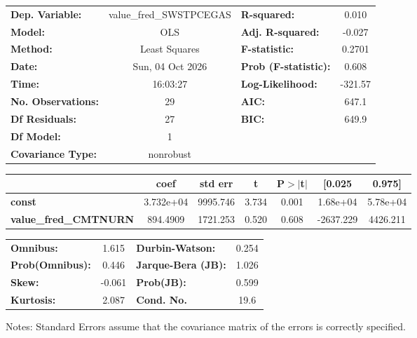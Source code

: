 \begin{center}
\begin{tabular}{lclc}
\toprule
\textbf{Dep. Variable:}       & value\_fred\_SWSTPCEGAS & \textbf{  R-squared:         } &     0.010   \\
\textbf{Model:}               &           OLS           & \textbf{  Adj. R-squared:    } &    -0.027   \\
\textbf{Method:}              &      Least Squares      & \textbf{  F-statistic:       } &    0.2701   \\
\textbf{Date:}                &     Sun, 04 Oct 2026    & \textbf{  Prob (F-statistic):} &    0.608    \\
\textbf{Time:}                &         16:03:27        & \textbf{  Log-Likelihood:    } &   -321.57   \\
\textbf{No. Observations:}    &              29         & \textbf{  AIC:               } &     647.1   \\
\textbf{Df Residuals:}        &              27         & \textbf{  BIC:               } &     649.9   \\
\textbf{Df Model:}            &               1         & \textbf{                     } &             \\
\textbf{Covariance Type:}     &        nonrobust        & \textbf{                     } &             \\
\bottomrule
\end{tabular}
\begin{tabular}{lcccccc}
                              & \textbf{coef} & \textbf{std err} & \textbf{t} & \textbf{P$> |$t$|$} & \textbf{[0.025} & \textbf{0.975]}  \\
\midrule
\textbf{const}                &    3.732e+04  &     9995.746     &     3.734  &         0.001        &     1.68e+04    &     5.78e+04     \\
\textbf{value\_fred\_CMTNURN} &     894.4909  &     1721.253     &     0.520  &         0.608        &    -2637.229    &     4426.211     \\
\bottomrule
\end{tabular}
\begin{tabular}{lclc}
\textbf{Omnibus:}       &  1.615 & \textbf{  Durbin-Watson:     } &    0.254  \\
\textbf{Prob(Omnibus):} &  0.446 & \textbf{  Jarque-Bera (JB):  } &    1.026  \\
\textbf{Skew:}          & -0.061 & \textbf{  Prob(JB):          } &    0.599  \\
\textbf{Kurtosis:}      &  2.087 & \textbf{  Cond. No.          } &     19.6  \\
\bottomrule
\end{tabular}
\end{center}

Notes: \newline
 [1] Standard Errors assume that the covariance matrix of the errors is correctly specified.